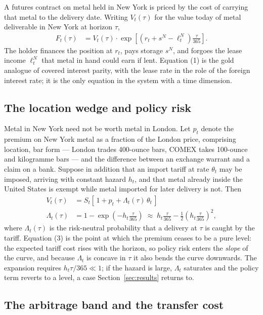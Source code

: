 \documentclass[11pt,a4paper]{article}
\newcommand{\sN}{s^{N}}
\newcommand{\lN}{\ell^{N}_{t}}
\begin{document}
A futures contract on metal held in New York is priced by the cost of carrying
that metal to the delivery date. Writing $V_t(\tau)$ for the value today of
metal deliverable in New York at horizon $\tau$,
\begin{align}
F_t(\tau) &= V_t(\tau)\cdot\exp\!\left[\left(r_t+\sN-\lN\right)\frac{\tau}{365}\right].
\end{align}
The holder finances the position at $r_t$, pays storage $\sN$, and forgoes the
lease income $\lN$ that metal in hand could earn if lent. Equation (1) is the
gold analogue of covered interest parity, with the lease rate in the role of
the foreign interest rate; it is the only equation in the system with a time
dimension.

\subsection{The location wedge and policy risk}

Metal in New York need not be worth metal in London. Let $p_t$ denote the
premium on New York metal as a fraction of the London price, comprising
location, bar form --- London trades 400-ounce bars, COMEX takes 100-ounce and
kilogramme bars --- and the difference between an exchange warrant and a claim
on a bank. Suppose in addition that an import tariff at rate $\theta_t$ may be
imposed, arriving with constant hazard $h_t$, and that metal already inside the
United States is exempt while metal imported for later delivery is not. Then
\begin{align}
V_t(\tau) &= S_t\left[\,1+p_t+\Lambda_t(\tau)\,\theta_t\,\right] \\[2pt]
\Lambda_t(\tau) &= 1-\exp\!\left(-h_t\frac{\tau}{365}\right)
   \;\approx\; h_t\frac{\tau}{365}-\frac{1}{2}\left(h_t\frac{\tau}{365}\right)^{\!2},
\end{align}
where $\Lambda_t(\tau)$ is the risk-neutral probability that a delivery at
$\tau$ is caught by the tariff. Equation (3) is the point at which the premium
ceases to be a pure level: the expected tariff cost rises with the horizon, so
policy risk enters the \emph{slope} of the curve, and because $\Lambda_t$ is
concave in $\tau$ it also bends the curve downwards. The expansion requires
$h_t\tau/365\ll1$; if the hazard is large, $\Lambda_t$ saturates and the policy
term reverts to a level, a case Section~\ref{sec:results} returns to.

\subsection{The arbitrage band and the transfer cost}
\end{document}
